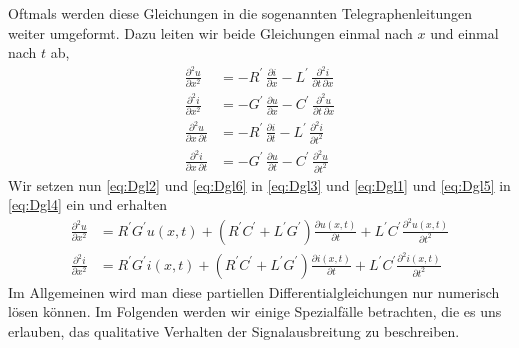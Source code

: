 \documentclass[paper=a4, parskip=half-, ngerman, fontsize=11pt]{scrreprt}
\begin{document}
Oftmals werden diese Gleichungen in die sogenannten Telegraphenleitungen weiter umgeformt. Dazu leiten wir beide
Gleichungen einmal nach $x$ und einmal nach $t$ ab,
\begin{align}
    \frac{\partial^{2} u}{\partial x^2} &= -R^{\prime} \, \frac{\partial i}{\partial x} - L^{\prime} \,
    \frac{\partial^2 i}{\partial t \,
    \partial x} \label{eq:Dgl3} \\[1ex]
    \frac{\partial^{2} i}{\partial x^2} &= -G^{\prime} \, \frac{\partial u}{\partial x} - C^{\prime} \,
    \frac{\partial^2 u}{\partial t \,
    \partial x} \label{eq:Dgl4} \\[1ex]
    \frac{\partial^{2} u}{\partial x \, \partial t} &= -R^{\prime} \, \frac{\partial i}{\partial t} - L^{\prime} \,
    \frac{\partial^2
    i}{\partial t^{2}} \label{eq:Dgl5} \\[1ex]
    \frac{\partial^{2} i}{\partial x \, \partial t} &= -G^{\prime} \, \frac{\partial u}{\partial t} - C^{\prime} \,
    \frac{\partial^2
    u}{\partial t^{2}} \label{eq:Dgl6}
\end{align}
Wir setzen nun \eqref{eq:Dgl2} und \eqref{eq:Dgl6} in \eqref{eq:Dgl3} und \eqref{eq:Dgl1} und \eqref{eq:Dgl5} in
\eqref{eq:Dgl4} ein und erhalten
\begin{align}
    \frac{\partial^{2} u}{\partial x^{2}} &= R^{\prime} G^{\prime} u(x,t) + (R^{\prime} C^{\prime} + L^{\prime}
    G^{\prime}) \frac{\partial u(x, t)}{\partial t} + L^{\prime} C^{\prime} \frac{\partial^{2} u(x,t)}{\partial t^{2}}
    \\[1.5ex]
    \frac{\partial^{2} i}{\partial x^{2}} &= R^{\prime} G^{\prime} i(x,t) + (R^{\prime} C^{\prime} + L^{\prime}
    G^{\prime}) \frac{\partial i(x, t)}{\partial t} + L^{\prime} C^{\prime} \frac{\partial^{2} i(x, t)}{\partial t^{2}}
\end{align}
Im Allgemeinen wird man diese partiellen Differentialgleichungen nur numerisch lösen können. Im Folgenden werden wir
einige Spezialfälle betrachten, die es uns erlauben, das qualitative Verhalten der Signalausbreitung zu beschreiben.
\end{document}
